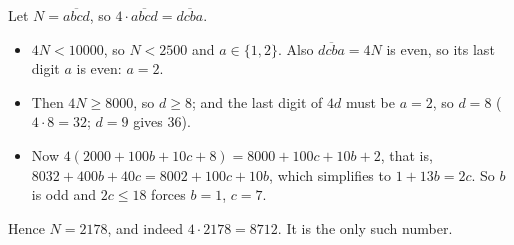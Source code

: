 Let $N=\overline{abcd}$, so $4\cdot\overline{abcd}=\overline{dcba}$.
\begin{itemize}
\item $4N<10000$, so $N<2500$ and $a\in\{1,2\}$. Also $\overline{dcba}=4N$ is even, so its last digit $a$ is even: $a=2$.
\item Then $4N\ge8000$, so $d\ge8$; and the last digit of $4d$ must be $a=2$, so $d=8$ ($4\cdot8=32$; $d=9$ gives $36$).
\item Now $4(2000+100b+10c+8)=8000+100c+10b+2$, that is, $8032+400b+40c=8002+100c+10b$, which simplifies to $1+13b=2c$. So $b$ is odd and $2c\le18$ forces $b=1$, $c=7$.
\end{itemize}
Hence $N=\boxed{2178}$, and indeed $4\cdot2178=8712$. It is the only such number.
